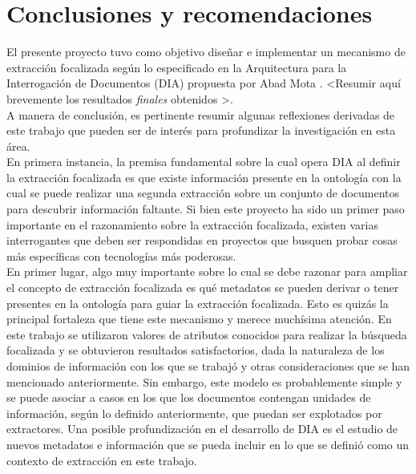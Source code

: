 \chapter*{Conclusiones y recomendaciones} \label{chap:conclusiones}

El presente proyecto tuvo como objetivo diseñar e implementar un mecanismo de extracción focalizada según lo especificado en la Arquitectura para la Interrogación de Documentos (DIA) propuesta por Abad Mota \cite{documentInterrogationArchitecture}.
\textless Resumir aquí brevemente los resultados \emph{finales} obtenidos \textgreater. \\

A manera de conclusión, es pertinente resumir algunas reflexiones derivadas de este trabajo que pueden ser de interés para profundizar la investigación en esta área. \\

En primera instancia, la premisa fundamental sobre la cual opera DIA al definir la extracción focalizada es que existe información presente en la ontología con la cual se puede realizar una segunda extracción sobre un conjunto de documentos para descubrir información faltante. Si bien este proyecto ha sido un primer paso importante en el razonamiento sobre la extracción focalizada, existen varias interrogantes que deben ser respondidas en proyectos que busquen probar cosas más específicas con tecnologías más poderosas. \\

En primer lugar, algo muy importante sobre lo cual se debe razonar para ampliar el concepto de extracción focalizada es qué metadatos se pueden derivar o tener presentes en la ontología para guiar la extracción focalizada. Esto es quizás la principal fortaleza que tiene este mecanismo y merece muchísima atención. En este trabajo se utilizaron valores de atributos conocidos para realizar la búsqueda focalizada y se obtuvieron resultados satisfactorios, dada la naturaleza de los dominios de información con los que se trabajó y otras consideraciones que se han mencionado anteriormente. Sin embargo, este modelo es probablemente simple y se puede asociar a casos en los que los documentos contengan unidades de información, según lo definido anteriormente, que puedan ser explotados por extractores. Una posible profundización en el desarrollo de DIA es el estudio de nuevos metadatos e información que se pueda incluir en lo que se definió como un contexto de extracción en este trabajo. \\

